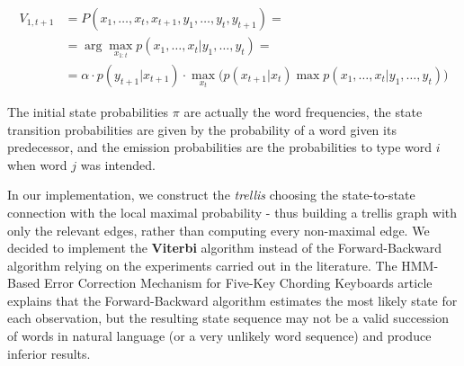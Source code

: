 \begin{equation}
\begin{aligned}
V_{1,t+1} &= P(x_1, \dots, x_t, x_{t+1}, y_1, \dots, y_t,  y_{t+1}) = \\
&= \arg\max_{x_{1:t}} p(x_1, \dots, x_t | y_1, \dots, y_t) = \\
& =  \alpha \cdot p(y_{t+1}|x_{t+1})\cdot\max_{x_t} \Big( p(x_{t+1}|x_t) \max p(x_1, \dots, x_{t}|y_1, 
\dots, y_t)\Big)
\end{aligned}
\end{equation}

The initial state probabilities $\pi$ are actually the word frequencies, the state 
transition probabilities are given by the probability of a word given its predecessor,
and the emission probabilities are the probabilities to type word $i$ when word $j$ was intended.

In our implementation, we construct the \textit{trellis} choosing the state-to-state connection with the local maximal probability - 
thus building a trellis graph with only the relevant edges, rather than computing every non-maximal edge.
We decided to implement the \textbf{Viterbi} algorithm instead of the Forward-Backward algorithm relying on 
the 
experiments carried out in the literature.
The HMM-Based Error Correction Mechanism for Five-Key Chording Keyboards article \cite{tarniceriu2015hmm} 
explains 
that the Forward-Backward algorithm estimates the most likely state for each observation, but the resulting state 
sequence may not be a valid succession of words in natural language (or a very unlikely word sequence) and 
produce 
inferior results.


